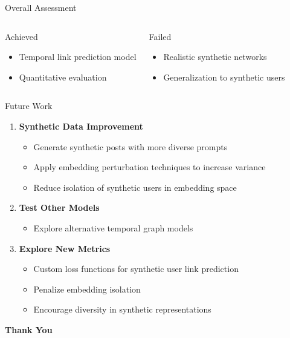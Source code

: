 \documentclass[aspectratio=169,xcolor=dvipsnames]{beamer}
\begin{document}
\begin{frame}{Overall Assessment}
	\begin{columns}[c]
		\begin{exampleblock}{Achieved}
			\begin{itemize}
				\item Temporal link prediction model
				\item Quantitative evaluation
			\end{itemize}
		\end{exampleblock}

		\begin{alertblock}{Failed}
			\begin{itemize}
				\item Realistic synthetic networks
				\item Generalization to synthetic users
			\end{itemize}
		\end{alertblock}
	\end{columns}
\end{frame}

\begin{frame}{Future Work}
	\begin{enumerate}
		\item \textbf{Synthetic Data Improvement}
		      \begin{itemize}
			      \item Generate synthetic posts with more diverse prompts
			      \item Apply embedding perturbation techniques to increase variance
			      \item Reduce isolation of synthetic users in embedding space
		      \end{itemize}

		      \vspace{0.3em}

		\item \textbf{Test Other Models}
		      \begin{itemize}
			      \item Explore alternative temporal graph models
		      \end{itemize}

		      \vspace{0.3em}

		\item \textbf{Explore New Metrics}
		      \begin{itemize}
			      \item Custom loss functions for synthetic user link prediction
			      \item Penalize embedding isolation
			      \item Encourage diversity in synthetic representations
		      \end{itemize}
	\end{enumerate}
\end{frame}

\begin{frame}
	\Huge{\centerline{\textbf{Thank You} }}
	\vspace{1em}
\end{frame}

\end{document}
